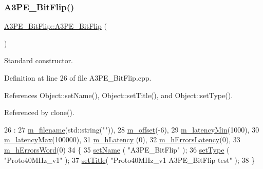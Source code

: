 \subsubsection{\texorpdfstring{A3\+P\+E\+\_\+\+Bit\+Flip()}{A3PE\_BitFlip()}}
{\footnotesize\ttfamily \hyperlink{classA3PE__BitFlip_1_1A3PE__BitFlip}{A3\+P\+E\+\_\+\+Bit\+Flip\+::\+A3\+P\+E\+\_\+\+Bit\+Flip} (\begin{DoxyParamCaption}{ }\end{DoxyParamCaption})}



Standard constructor. 



Definition at line 26 of file A3\+P\+E\+\_\+\+Bit\+Flip.\+cpp.



References Object\+::set\+Name(), Object\+::set\+Title(), and Object\+::set\+Type().



Referenced by clone().


\begin{DoxyCode}
26                              :
27   \hyperlink{classA3PE__BitFlip_a72eecaff11d66c7f3eee10a9b2bfa301}{m\_filename}(std::string(\textcolor{stringliteral}{""})),
28   \hyperlink{classA3PE__BitFlip_ac0797dd65b1aeab96647d795e2f1a447}{m\_offset}(-6),
29   \hyperlink{classA3PE__BitFlip_aeae11ece90351542cae8e0590d9162ee}{m\_latencyMin}(1000),
30   \hyperlink{classA3PE__BitFlip_adfeac5a7ab09d89f0d0146113dd55dde}{m\_latencyMax}(100000),
31   \hyperlink{classA3PE__BitFlip_a83928ea28c555c19f4e95cf7863c1b0c}{m\_hLatency} (0),
32   \hyperlink{classA3PE__BitFlip_a4dec854e8123271c9a624ca46c50dfd5}{m\_hErrorsLatency}(0),
33   \hyperlink{classA3PE__BitFlip_a0d9ea71af465c060689be4c05cba9a8e}{m\_hErrorsWord}(0)
34 \{
35   \hyperlink{classObject_ae30fea75683c2d149b6b6d17c09ecd0c}{setName} ( \textcolor{stringliteral}{"A3PE\_BitFlip"} );
36   \hyperlink{classObject_aae534cc9d982bcb9b99fd505f2e103a5}{setType} ( \textcolor{stringliteral}{"Proto40MHz\_v1"} );
37   \hyperlink{classObject_a89557dbbad5bcaa02652f5d7fa35d20f}{setTitle}( \textcolor{stringliteral}{"Proto40MHz\_v1 A3PE\_BitFlip test"} );
38 \}
\end{DoxyCode}
\mbox{\label{classA3PE__BitFlip_ab58f69a2c8d342bcad937b1dbc0bb3ed}} 
